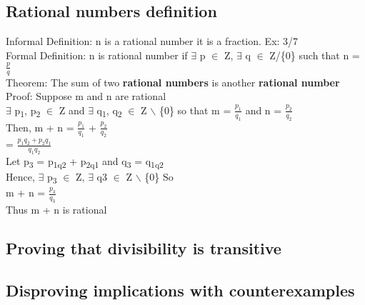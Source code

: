 \documentclass[11pt]{article}
\begin{document}
\subsection{Rational numbers definition}
\label{sec:org5a92f1b}
Informal Definition: n is a rational number it is a fraction. Ex: 3/7\\
Formal Definition: n is rational number if \(\exists\) p \(\in\) Z, \(\exists\) q \(\in\) Z/\{0\} such that n = \(\frac{p}{q}\)\\


Theorem: The sum of two \textbf{rational numbers} is another \textbf{rational number}\\
Proof: Suppose m and n are rational\\
\(\exists\) p\textsubscript{1}, p\textsubscript{2} \(\in\) Z and \(\exists\) q\textsubscript{1}, q\textsubscript{2} \(\in\) Z $\backslash$ \{0\} so that m = \(\frac{p_1}{q_1}\) and n = \(\frac{p_2}{q_2}\)\\
Then, m + n = \(\frac{p_1}{q_1}\) + \(\frac{p_2}{q_2}\)\\
= \(\frac{p_1q_2+p_2q_1}{q_1q_2}\)\\
Let p\textsubscript{3} = p\textsubscript{1q}\textsubscript{2} + p\textsubscript{2q}\textsubscript{1} and q\textsubscript{3} = q\textsubscript{1q}\textsubscript{2}\\
Hence, \(\exists\) p\textsubscript{3} \(\in\) Z, \(\exists\) q3 \(\in\) Z $\backslash$ \{0\} So\\
m + n = \(\frac{p_3}{q_3}\)\\
Thus m + n is rational\\


\subsection{Proving that divisibility is transitive}
\label{sec:org7950244}

\subsection{Disproving implications with counterexamples}
\label{sec:org09bcc37}

\subsection{}
\label{sec:org1281ec6}
\end{document}
